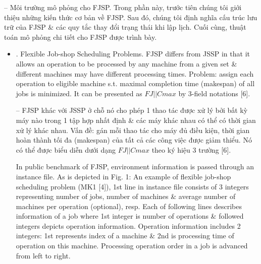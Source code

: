 \documentclass{article}
\begin{document}
\begin{itemize}
    -- {\sf Môi trường mô phỏng cho FJSP.} Trong phần này, trước tiên chúng tôi giới thiệu những kiến thức cơ bản về FJSP. Sau đó, chúng tôi định nghĩa cấu trúc lưu trữ của FJSP \& các quy tắc thay đổi trạng thái khi lập lịch. Cuối cùng, thuật toán mô phỏng chi tiết cho FJSP được trình bày.
    \begin{itemize}
        \item {. Flexible Job-shop Scheduling Problems.} FJSP differs from JSSP in that it allows an operation to be processed by any machine from a given set \& different machines may have different processing times. Problem: assign each operation to eligible machine s.t. maximal completion time (makespan) of all jobs is minimized. It can be presented as $FJ||Cmax$ by 3-field notations [6].

        -- FJSP khác với JSSP ở chỗ nó cho phép 1 thao tác được xử lý bởi bất kỳ máy nào trong 1 tập hợp nhất định \& các máy khác nhau có thể có thời gian xử lý khác nhau. Vấn đề: gán mỗi thao tác cho máy đủ điều kiện, thời gian hoàn thành tối đa (makespan) của tất cả các công việc được giảm thiểu. Nó có thể được biểu diễn dưới dạng $FJ||Cmax$ theo ký hiệu 3 trường [6].

        In public benchmark of FJSP, environment information is passed through an instance file. As is depicted in {\sf Fig. 1: An example of flexible job-shop scheduling problem (MK1 [4])}, 1st line in instance file consists of 3 integers representing number of jobs, number of machines \& average number of machines per operation (optional), resp. Each of following lines describes information of a job where 1st integer is number of operations \& followed integers depicts operation information. Operation information includes 2 integers: 1st represents index of a machine \& 2nd is processing time of operation on this machine. Processing operation order in a job is advanced from left to right.


\end{itemize}
\end{itemize}
\end{document}
